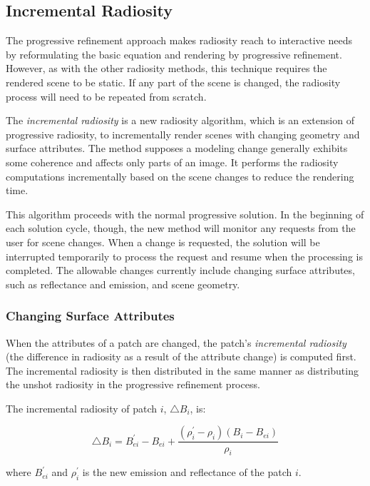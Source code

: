 \subsection{Incremental Radiosity}
The progressive refinement approach makes radiosity reach to interactive needs by reformulating the basic equation and rendering by progressive refinement. However, as with the other radiosity methods, this technique requires the rendered scene to be static. If any part of the scene is changed, the radiosity process will need to be repeated from scratch.

The \textit{incremental radiosity}\cite{a:IncrementalRadiosity:AnExtensionofProgressiveRadiositytoanInteractiveImageSynthesisSystem} is a new radiosity algorithm, which is an extension of progressive radiosity, to incrementally render scenes with changing geometry and surface attributes. The method supposes a modeling change generally exhibits some coherence and affects only parts of an image. It performs the radiosity computations incrementally based on the scene changes to reduce the rendering time.

This algorithm proceeds with the normal progressive solution. In the beginning of each solution cycle, though, the new method will monitor any requests from the user for scene changes. When a change is requested, the solution will be interrupted temporarily to process the request and resume when the processing is completed. The allowable changes currently include changing surface attributes, such as reflectance and emission, and scene geometry.



\subsubsection{Changing Surface Attributes}
When the attributes of a patch are changed, the patch's \textit{incremental radiosity} (the difference in radiosity as a result of the attribute change) is computed first. The incremental radiosity is then distributed in the same manner as distributing the unshot radiosity in the progressive refinement process.

The incremental radiosity of patch $i$, $\triangle B_i$, is:

\begin{equation}
	\triangle B_i=B^{'}_{ei}-B_{ei}+\frac{(\rho^{'}_i-\rho_i)(B_i-B_{ei})}{\rho_i}
\end{equation}

where $B^{'}_{ei}$ and $\rho^{'}_i$ is the new emission and reflectance of the patch $i$.


